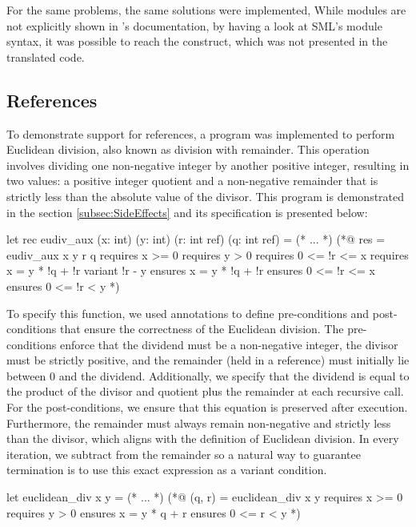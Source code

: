 For the same problems, the same solutions were implemented, While modules are not explicitly shown
in \cml's documentation, by having a look at SML's module syntax, it was possible to reach the 
 construct, which was not presented in the translated code.

\subsection{References}

To demonstrate support for references, a program was implemented to perform Euclidean division, also known as division with remainder. 
This operation involves dividing one non-negative integer by another positive integer, resulting in two values: a positive integer 
quotient and a non-negative remainder that is strictly less than the absolute value of the divisor. This program is demonstrated 
in the section \ref{subsec:SideEffects} and its specification is presented below:

\begin{gospell}
let rec eudiv_aux (x: int) (y: int) (r: int ref) (q: int ref) = (* ... *)
(*@ res = eudiv_aux x y r q
    requires x >= 0
    requires y > 0
    requires 0 <= !r <= x
    requires x = y * !q + !r
    variant !r - y
    ensures x = y * !q + !r
    ensures 0 <= !r <= x
    ensures 0 <= !r < y *)
\end{gospell}

To specify this function, we used \gospel annotations to define pre-conditions and post-conditions that ensure the correctness of 
the Euclidean division. The pre-conditions enforce that the dividend must be a non-negative integer, the divisor must be strictly 
positive, and the remainder (held in a reference) must initially lie between 0 and the dividend. Additionally, we specify that the 
dividend is equal to the product of the divisor and quotient plus the remainder at each recursive call. For the post-conditions, we 
ensure that this equation is preserved after execution. Furthermore, the remainder must always remain non-negative and strictly less 
than the divisor, which aligns with the definition of Euclidean division. In every iteration, we subtract  from the
remainder  so a natural way to guarantee termination is to use this exact expression as a variant condition.

\begin{gospell}
let euclidean_div x y = (* ... *)
(*@ (q, r) = euclidean_div x y
    requires x >= 0
    requires y > 0
    ensures x = y * q + r
    ensures 0 <= r < y *)
\end{gospell}

